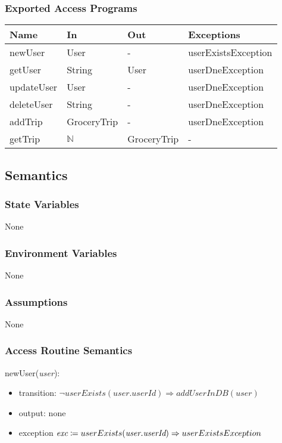 \documentclass[12pt, titlepage]{article}
\begin{document}
\subsubsection{Exported Access Programs}

\begin{center}
\begin{tabular}{p{5cm} p{3cm} p{3cm} p{5cm}}
\hline
\textbf{Name} & \textbf{In} & \textbf{Out} & \textbf{Exceptions} \\
\hline
newUser & User & - & userExistsException \\
getUser & String & User & userDneException \\
updateUser & User & - & userDneException \\
deleteUser & String & - & userDneException \\
addTrip & GroceryTrip & - & userDneException \\
getTrip & $\mathbb{N}$ & GroceryTrip & - \\
\hline
\end{tabular}
\end{center}

\subsection{Semantics}

\subsubsection{State Variables}
None

\subsubsection{Environment Variables}
None

\subsubsection{Assumptions}
None

\subsubsection{Access Routine Semantics}

\noindent newUser(\textit{user}):
\begin{itemize}
\item transition: \( \neg userExists(\textit{user.userId}) \Rightarrow addUserInDB(\textit{user})\) 
\item output: none
\item exception \( \textit{exc} \coloneqq userExists(\textit{user.userId}) \Rightarrow \\ userExistsException\)
\end{itemize}
\end{document}
